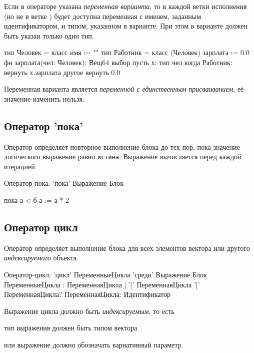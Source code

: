 Если в операторе указана \emph{переменная варианта}, то в каждой ветки исполнения 
(но не в ветке ) будет доступна переменная с именем, заданным идентификатором,
 и типом, указанном в варианте. При этом в варианте должен быть указан только один тип.
 
\begin{Trivil}
тип Человек = класс { имя := "" }
тип Работник = класс (Человек) {
    зарплата := 0.0
}
фн зарплата(чел: Человек): Вещ64 {
    выбор пусть х: тип чел { 
    когда Работник: вернуть х.зарплата
    другое вернуть 0.0
    }
}
\end{Trivil}

Переменная варианта является \emph{переменной с единственным присваиванием}, 
её значение изменить нельзя.

\hypertarget{while-stmt}{%
\subsection{Оператор 'пока' }\label{stmt:while-stmt}}

Оператор  определяет повторное выполнение блока до тех пор, пока значение логического выражение равно \verb+истина+. 
Выражение вычисляется перед каждой итерацией.

\begin{Grammar}
Оператор-пока: 'пока' Выражение Блок 
\end{Grammar}

\begin{Trivil}
пока а < б {
    а := а * 2
}
\end{Trivil}

\hypertarget{cycle-stmt}{%
\subsection{Оператор цикл }\label{stmt:cycle-stmt}}

Оператор  определяет выполнение блока для всех элементов вектора или другого \emph{индексируемого} объекта. 

\begin{Grammar}
Оператор-цикл: 
    'цикл'  ПеременныеЦикла 'среди' Выражение Блок 
ПеременныеЦикла
    : ПеременнаяЦикла
    | '[' ПеременнаяЦикла ']' ПеременнаяЦикла?
ПеременнаяЦикла: Идентификатор    
\end{Grammar}

Выражение цикла должно быть \emph{индексируемым}, то есть
\begin{d_itemize}
\item
    тип выражения должен быть типом вектора 
\item
    или выражение должно обозначать вариативный параметр.
\end{d_itemize}

